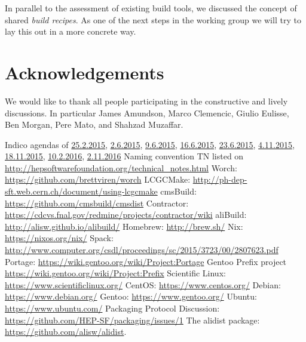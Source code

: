 \documentclass[12pt,a4paper]{article}
\begin{document}
In parallel to the assessment of existing build tools, we discussed the concept of shared \emph{build recipes}. As one of the next steps in the working group we will try to lay this out in a more concrete way.

\section*{Acknowledgements}
We would like to thank all people participating in the constructive and lively discussions. In particular James Amundson, Marco Clemencic, Giulio Eulisse, Ben Morgan, Pere Mato, and Shahzad Muzaffar.

\begin{thebibliography}{9}
 Indico agendas of
\href{https://indico.cern.ch/event/373973/}{25.2.2015},
\href{https://indico.cern.ch/event/398344/}{2.6.2015},
\href{https://indico.cern.ch/event/400272/}{9.6.2015},
\href{https://indico.cern.ch/event/402229/}{16.6.2015},
\href{https://indico.cern.ch/event/403790/}{23.6.2015},
\href{https://indico.cern.ch/event/457365/}{4.11.2015},
\href{https://indico.cern.ch/event/462334/}{18.11.2015},
\href{https://indico.cern.ch/event/484006/}{10.2.2016},
\href{https://indico.cern.ch/event/581338/}{2.11.2016}
Naming convention TN listed on \url{http://hepsoftwarefoundation.org/technical_notes.html}
 Worch: \url{https://github.com/brettviren/worch}
 LCGCMake: \url{http://ph-dep-sft.web.cern.ch/document/using-lcgcmake}
 cmsBuild: \url{https://github.com/cmsbuild/cmsdist}
 Contractor: \url{https://cdcvs.fnal.gov/redmine/projects/contractor/wiki}
 aliBuild: \url{http://alisw.github.io/alibuild/}
 Homebrew: \url{http://brew.sh/}
 Nix: \url{https://nixos.org/nix/}
 Spack: \url{http://www.computer.org/csdl/proceedings/sc/2015/3723/00/2807623.pdf}
 Portage: \url{https://wiki.gentoo.org/wiki/Project:Portage}
 Gentoo Prefix project \url{https://wiki.gentoo.org/wiki/Project:Prefix}
 Scientific Linux: \url{https://www.scientificlinux.org/}
 CentOS: \url{https://www.centos.org/}
 Debian: \url{https://www.debian.org/}
 Gentoo: \url{https://www.gentoo.org/}
 Ubuntu: \url{https://www.ubuntu.com/}
 Packaging Protocol Discussion:  \url{https://github.com/HEP-SF/packaging/issues/1}
 The alidist package: \url{https://github.com/alisw/alidist}.
\end{thebibliography}
\end{document}
